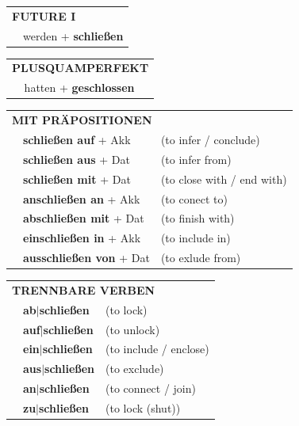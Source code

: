 \documentclass[10pt,a4paper]{revtex4-2}
\begin{document}
\begin{verbbox-acc}
\begin{tabular}{rl}
    \multicolumn{2}{l}{\textbf{FUTURE I} }\\
   & werden + \textbf{schließen}\\
 
  \end{tabular}
\hfill
   \begin{tabular}{rl}
      \multicolumn{2}{l}{\textbf{PLUSQUAMPERFEKT}}\\
   & hatten + \textbf{geschlossen}\\
  \end{tabular}
  
  \vspace{10pt}

   \begin{tabular}{lll}
      \multicolumn{3}{l}{\textbf{MIT PRÄPOSITIONEN}}\\
      & \textbf{schließen auf} + Akk & (to infer / conclude)\\
&\textbf{schließen aus} + Dat & (to infer from)\\
&\textbf{schließen mit} + Dat & (to close with / end with)\\
& \textbf{anschließen an} + Akk & (to conect to)\\
& \textbf{abschließen mit} + Dat & (to finish with)\\
&\textbf{einschließen in} + Akk & (to include in)\\
&\textbf{ausschließen von} + Dat & (to exlude from)
  \end{tabular}
  \hfill
   \begin{tabular}{lll}
      \multicolumn{3}{l}{\textbf{TRENNBARE VERBEN}}\\
 & \textbf{ab$|$schließen} & (to lock)\\
 & \textbf{auf$|$schließen} & (to unlock)\\
 & \textbf{ein$|$schließen} & (to include / enclose)\\
  & \textbf{aus$|$schließen} & (to exclude)\\
  & \textbf{an$|$schließen} & (to connect / join)\\
  & \textbf{zu$|$schließen} & (to lock (shut))
  \end{tabular}




  \vspace{-5pt}

\end{verbbox-acc}
\end{document}
